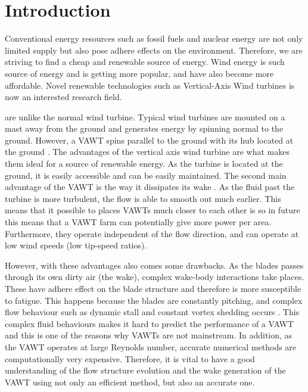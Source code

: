 \chapter{Introduction}
\label{ch:Introduction}

Conventional energy resources such as fossil fuels and nuclear energy are not only limited supply but also pose adhere effects on the environment. Therefore, we are striving to find a cheap and renewable source of energy. Wind energy is such source of energy and is getting more popular, and have also become more affordable. Novel renewable technologies such as Vertical-Axis Wind turbines is now an interested research field.

 are unlike the normal wind turbine. Typical wind turbines are mounted on a mast away from the ground and generates energy by spinning normal to the ground. However, a VAWT spins parallel to the ground with its hub located at the ground \cite{website:wikiVAWT}. The advantages of the vertical axis wind turbine are what makes them ideal for a source of renewable energy.  As the turbine is located at the ground, it is easily accessible and can be easily maintained. The second main advantage of the VAWT is the way it dissipates its wake \cite{Ferreira} \cite{Vermeer2003}. As the fluid past the turbine is more turbulent, the flow is able to smooth out much earlier. This means that it possible to places VAWTs much closer to each other is so in future this means that a VAWT farm can potentially give more power per area. Furthermore, they operate independent of the flow direction, and can operate at low wind speeds (low tip-speed ratios).

However, with these advantages also comes some drawbacks. As the blades passes through its own dirty air (the wake), complex wake-body interactions take places. These have adhere effect on the blade structure and therefore is more susceptible to fatigue. This happens because the blades are constantly pitching, and complex flow behaviour such as dynamic stall and constant vortex shedding occurs \cite{SimaoFerreira2008}. This complex fluid behaviours makes it hard to predict the performance of a VAWT and this is one of the reasons why VAWTs are not mainstream. In addition, as the VAWT operates at large Reynolds number, accurate numerical methods are computationally very expensive. Therefore, it is vital to have a good understanding of the flow structure evolution and the wake generation of the VAWT using not only an efficient method, but also an accurate one.

